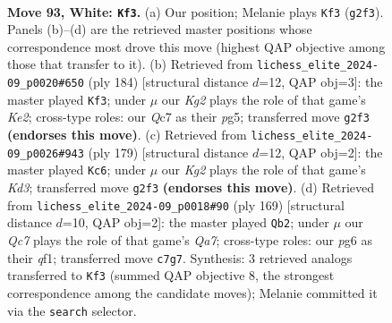 \documentclass[11pt]{article}
\begin{document}
\clearpage

\begin{figure}[p]\centering
\begin{subfigure}{0.46\textwidth}\centering
\resizebox{\linewidth}{!}{%
\newchessgame
\chessboard[
  setfen={R7/2Q5/6p1/5p2/1k3P2/8/6K1/8 w - - 5 93},
  showmover=false,
  pgfstyle=straightmove, color=movearrow, markmove={g2-f3}
]}
\caption{}
\end{subfigure}\hfill
\begin{subfigure}{0.46\textwidth}\centering
\resizebox{\linewidth}{!}{%
\newchessgame
\chessboard[
  setfen={8/8/8/6p1/3k3p/7P/4K1P1/8 w - - 6 93},
  showmover=false,
  pgfstyle=straightmove, color=movearrow, markmove={e2-f3}
]}
\caption{}
\end{subfigure}
\\[4pt]
\begin{subfigure}{0.46\textwidth}\centering
\resizebox{\linewidth}{!}{%
\newchessgame
\chessboard[
  setfen={8/8/p2k4/P7/1P1K4/8/8/8 b - - 18 90},
  showmover=false,
  pgfstyle=straightmove, color=movearrow, markmove={d6-c6}
]}
\caption{}
\end{subfigure}\hfill
\begin{subfigure}{0.46\textwidth}\centering
\resizebox{\linewidth}{!}{%
\newchessgame
\chessboard[
  setfen={8/1k3p2/5P2/8/8/4K3/q7/5Q2 b - - 4 85},
  showmover=false,
  pgfstyle=straightmove, color=movearrow, markmove={a2-b2}
]}
\caption{}
\end{subfigure}
\caption{\textbf{Move 93, White: \texttt{Kf3}.} (a) Our position; Melanie plays \texttt{Kf3} (\texttt{g2f3}). Panels (b)--(d) are the retrieved master positions whose correspondence most drove this move (highest QAP objective among those that transfer to it). (b) Retrieved from \texttt{lichess\_elite\_2024-09\_p0020\#650} (ply 184) [structural distance $d$=12, QAP obj=3]: the master played \texttt{Kf3}; under $\mu$ our \emph{Kg2} plays the role of that game's \emph{Ke2}; cross-type roles: our \emph{Q}c7 as their \emph{p}g5; transferred move \texttt{g2f3} \textbf{(endorses this move)}. (c) Retrieved from \texttt{lichess\_elite\_2024-09\_p0026\#943} (ply 179) [structural distance $d$=12, QAP obj=2]: the master played \texttt{Kc6}; under $\mu$ our \emph{Kg2} plays the role of that game's \emph{Kd3}; transferred move \texttt{g2f3} \textbf{(endorses this move)}. (d) Retrieved from \texttt{lichess\_elite\_2024-09\_p0018\#90} (ply 169) [structural distance $d$=10, QAP obj=2]: the master played \texttt{Qb2}; under $\mu$ our \emph{Qc7} plays the role of that game's \emph{Qa7}; cross-type roles: our \emph{p}g6 as their \emph{q}f1; transferred move \texttt{c7g7}. Synthesis: 3 retrieved analogs transferred to \texttt{Kf3} (summed QAP objective 8, the strongest correspondence among the candidate moves); Melanie committed it via the \texttt{search} selector.}
\label{fig:thought-m184}
\end{figure}
\end{document}
